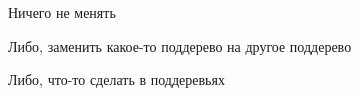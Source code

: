 \begin{code}%
\>  \AgdaSymbol{:}    \<%
\end{code}

Ничего не менять

\begin{code}%
\>[0]\<[2]%
\>[2] \AgdaSymbol{:}  \<%
\end{code}

Либо, заменить какое-то поддерево на другое поддерево

\begin{code}%
\>[0]\<[2]%
\>[2] \AgdaSymbol{:} \AgdaSymbol{(}  \AgdaSymbol{:} \AgdaSymbol{)}   \<%
\end{code}

Либо, что-то сделать в поддеревьях

\begin{code}%
\>[0]\<[2]%
\>[2] \AgdaSymbol{:}  \AgdaSymbol{\{}  \AgdaSymbol{:} \AgdaSymbol{\}}  \AgdaSymbol{(} \AgdaSymbol{:}  \AgdaSymbol{)} \AgdaSymbol{(} \AgdaSymbol{:}  \AgdaSymbol{)}\<%
\\
\>[2]\<[4]%
\>[4]  \AgdaSymbol{(}  \AgdaSymbol{)}\<%
\end{code}

